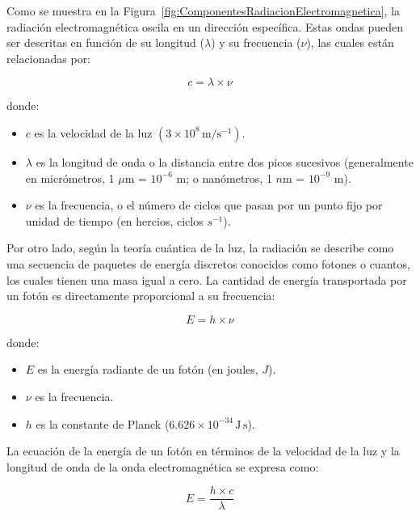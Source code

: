 Como se muestra en la Figura~\ref{fig:ComponentesRadiacionElectromagnetica}, la radiación electromagnética oscila en un dirección específica. Estas ondas pueden ser descritas en función de su longitud (\(\lambda\)) y su frecuencia (\(\nu\)), las cuales están relacionadas por:

\begin{equation}
    \label{eq:LongitudOndaFrecuencia}
    c = \lambda \times \nu
\end{equation}

donde:
\begin{itemize}
    \item $c$ es la velocidad de la luz $(3 \times 10^8 \, \mathrm{m/s^{-1}})$.
    \item \(\lambda\) es la longitud de onda o la distancia entre dos picos sucesivos (generalmente en micrómetros, 1 $\mu$m = \(10^{-6}\) m; o nanómetros, 1 $n$m = \(10^{-9}\) m).
    \item \(\nu\) es la frecuencia, o el número de ciclos que pasan por un punto fijo por unidad de tiempo (en hercios, ciclos $s^{-1}$).
\end{itemize}

Por otro lado, según la teoría cuántica de la luz, la radiación se describe como una secuencia de paquetes de energía discretos conocidos como fotones o cuantos, los cuales tienen una masa igual a cero. La cantidad de energía transportada por un fotón es directamente proporcional a su frecuencia:

\begin{equation}
    \label{eq:TeoriaCuanticaLuz}
    E = h \times \nu
\end{equation}

donde:
\begin{itemize}
    \item $E$ es la energía radiante de un fotón (en joules, $J$).
    \item \(\nu\) es la frecuencia.
    \item $h$ es la constante de Planck (\(6.626 \times 10^{-34} \, \mathrm{J \, s}\)).
\end{itemize}

La ecuación de la energía de un fotón en términos de la velocidad de la luz y la longitud de onda de la onda electromagnética se expresa como:

\begin{equation}
    E = \frac{{h \times c}} {{\lambda}}
\end{equation}

